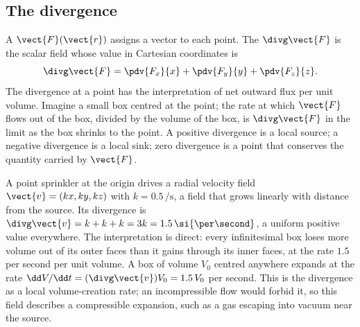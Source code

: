 \subsection{The divergence}

A  $\vect{F}(\vect{r})$ assigns a vector to each
point. The  $\divg\vect{F}$ is the scalar field
whose value in Cartesian coordinates is
\[
\divg\vect{F} = \pdv{F_{x}}{x} + \pdv{F_{y}}{y} + \pdv{F_{z}}{z}.
\]
The divergence at a point has the interpretation of net outward flux
per unit volume. Imagine a small box centred at the point; the rate
at which $\vect{F}$ flows out of the box, divided by the volume of
the box, is $\divg\vect{F}$ in the limit as the box shrinks to the
point. A positive divergence is a local source; a negative divergence
is a local sink; zero divergence is a point that conserves the
quantity carried by $\vect{F}$.

\begin{example}
A point sprinkler at the origin drives a radial velocity field
$\vect{v} = (kx, ky, kz)$ with $k = 0.5\,\si{\per\second}$, a field
that grows linearly with distance from the source. Its divergence is
$\divg\vect{v} = k + k + k = 3k = 1.5\,\si{\per\second}$, a uniform
positive value everywhere. The interpretation is direct: every
infinitesimal box loses more volume out of its outer faces than it
gains through its inner faces, at the rate $1.5$ per second per unit
volume. A box of volume $V_{0}$ centred anywhere expands at the rate
$\dd V/\dd t = (\divg\vect{v})V_{0} = 1.5\,V_{0}$ per second. This is
the divergence as a local volume-creation rate; an incompressible
flow would forbid it, so this field describes a compressible
expansion, such as a gas escaping into vacuum near the source.
\end{example}

